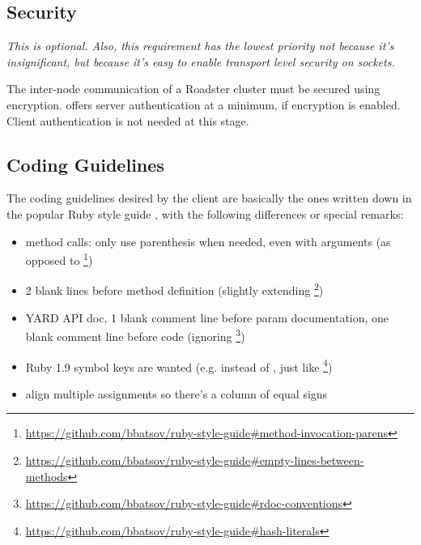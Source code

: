 \subsection{Security}
\emph{This is optional. Also, this requirement has the lowest priority not
because it's insignificant, but because it's easy to enable transport level
security on \zmq sockets.}

The inter-node communication of a Roadster cluster must be secured using
encryption. \zmq offers server authentication at a minimum, if encryption is
enabled. Client authentication is not needed at this stage.

\subsection{Coding Guidelines}
The coding guidelines desired by the client are basically the ones written down
in the popular Ruby style guide \cite{rb:style-guide}, with the following
differences or special remarks:

\begin{itemize}
	\item method calls: only use parenthesis when needed, even with arguments (as opposed to \footnote{\url{https://github.com/bbatsov/ruby-style-guide\#method-invocation-parens}})
	\item 2 blank lines before method definition (slightly extending \footnote{\url{https://github.com/bbatsov/ruby-style-guide\#empty-lines-between-methods}})
	\item YARD API doc, 1 blank comment line before param documentation, one blank comment line before code (ignoring \footnote{\url{https://github.com/bbatsov/ruby-style-guide\#rdoc-conventions}})
	\item Ruby 1.9 symbol keys are wanted (e.g.  instead of , just like \footnote{\url{https://github.com/bbatsov/ruby-style-guide\#hash-literals}})
	\item align multiple assignments so there's a column of equal signs
\end{itemize}
